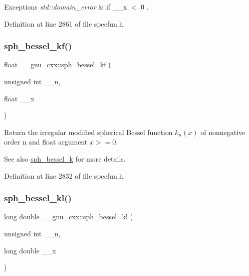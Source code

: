 \begin{DoxyExceptions}{Exceptions}
{\em std\+::domain\+\_\+error} & if {\ttfamily  \+\_\+\+\_\+x $<$ 0 }. \\
\hline
\end{DoxyExceptions}


Definition at line 2861 of file specfun.\+h.

\mbox{\label{group__mathsf__gnu_gaf886e8f8dfd2af0c4a9c5929d193d12f}} 
\subsubsection{\texorpdfstring{sph\+\_\+bessel\+\_\+kf()}{sph\_bessel\_kf()}}
{\footnotesize\ttfamily float \+\_\+\+\_\+gnu\+\_\+cxx\+::sph\+\_\+bessel\+\_\+kf (\begin{DoxyParamCaption}\item[{unsigned int}]{\+\_\+\+\_\+n,  }\item[{float}]{\+\_\+\+\_\+x }\end{DoxyParamCaption})\hspace{0.3cm}{\ttfamily [inline]}}

Return the irregular modified spherical Bessel function $ k_n(x) $ of nonnegative order n and {\ttfamily float} argument $ x >= 0 $.

\begin{DoxySeeAlso}{See also}
\hyperlink{group__mathsf__gnu_ga288b28f2c6995d052a4f5f17293cbf1a}{sph\+\_\+bessel\+\_\+k} for more details. 
\end{DoxySeeAlso}


Definition at line 2832 of file specfun.\+h.

\mbox{\label{group__mathsf__gnu_ga22f6a73e50e7020a7c2fa64ce1b9be41}} 
\subsubsection{\texorpdfstring{sph\+\_\+bessel\+\_\+kl()}{sph\_bessel\_kl()}}
{\footnotesize\ttfamily long double \+\_\+\+\_\+gnu\+\_\+cxx\+::sph\+\_\+bessel\+\_\+kl (\begin{DoxyParamCaption}\item[{unsigned int}]{\+\_\+\+\_\+n,  }\item[{long double}]{\+\_\+\+\_\+x }\end{DoxyParamCaption})\hspace{0.3cm}{\ttfamily [inline]}}

